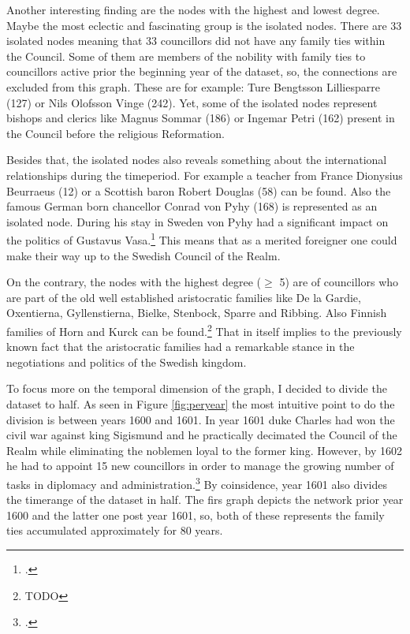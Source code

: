 Another interesting finding are the nodes with the highest and lowest degree. Maybe the most eclectic and fascinating group is the isolated nodes. There are 33 isolated nodes meaning that 33 councillors did not have any family ties within the Council. Some of them are members of the nobility with family ties to councillors active prior the beginning year of the dataset, so, the connections are excluded from this graph. These are for example: Ture Bengtsson Lilliesparre (127) or Nils Olofsson Vinge (242). Yet, some of the isolated nodes represent bishops and clerics like Magnus Sommar (186) or Ingemar Petri (162) present in the Council before the religious Reformation. 

Besides that, the isolated nodes also reveals something about the international relationships during the timeperiod. For example a teacher from France Dionysius Beurraeus (12) or a Scottish baron Robert Douglas (58) can be found. Also the famous German born chancellor Conrad von Pyhy (168) is represented as an isolated node. During his stay in Sweden von Pyhy had a significant impact on the politics of Gustavus Vasa.\footcite[p. 81-83.]{pSuurvalta} This means that as a merited foreigner one could make their way up to the Swedish Council of the Realm.

On the contrary, the nodes with the highest degree ($\geq$ 5) are of councillors who are part of the old well established aristocratic families like De la Gardie, Oxentierna, Gyllenstierna, Bielke, Stenbock, Sparre and Ribbing. Also Finnish families of Horn and Kurck can be found.\footnote{TODO} That in itself implies to the previously known fact that the aristocratic families had a remarkable stance in the negotiations and politics of the Swedish kingdom.

To focus more on the temporal dimension of the graph, I decided to divide the dataset to half. As seen in Figure \ref{fig:peryear} the most intuitive point to do the division is between years 1600 and 1601. In year 1601 duke Charles had won the civil war against king Sigismund and he practically decimated the Council of the Realm while eliminating the noblemen loyal to the former king. However, by 1602 he had to appoint 15 new councillors in order to manage the growing number of tasks in diplomacy and administration.\footcite[TODO]{pSuurvalta} By coinsidence, year 1601 also divides the timerange of the dataset in half. The firs graph depicts the network prior year 1600 and the latter one post year 1601, so, both of these represents the family ties accumulated approximately for 80 years.

